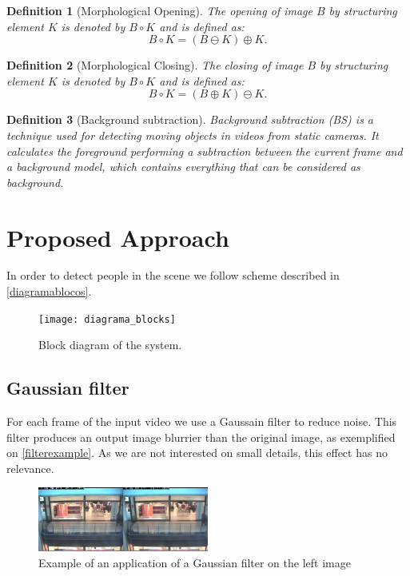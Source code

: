 \documentclass[10pt, conference]{IEEEtran}
\newtheorem{definition}{Definition}
\begin{document}
	\begin{definition}[Morphological Opening]
		The opening of image $B$ by structuring	element $K$ is denoted by $B \circ K$ and is defined as: $$B \circ K =(B \ominus K) \oplus K.$$
	\end{definition}
	
	\begin{definition}[Morphological Closing]
		The closing of image $B$ by structuring	element $K$ is denoted by $B \circ K$ and is defined as: $$B \circ K =(B \oplus K) \ominus K.$$
	\end{definition}
	
	\begin{definition}[Background subtraction]
		Background subtraction (BS) is a technique used for detecting moving objects in videos from static cameras. It calculates the foreground performing a subtraction between the current frame and a background model, which contains everything that can be considered as background.
	\end{definition}
	
	\section{Proposed Approach}
	In order to detect people in the scene we follow scheme described in \autoref{diagramablocos}.
	\begin{figure}[H]
		\centering
		\texttt{[image: diagrama\_blocks]}
		\caption{Block diagram of the system.}
		\label{diagramablocos}
	\end{figure}
	
	
	\subsection{Gaussian filter}
	For each frame of the input video we use a Gaussain filter to reduce noise. This filter produces an output image blurrier than the original image, as exemplified on \autoref{filterexample}. As we are not interested on small details, this effect has no relevance.
	\begin{figure}[H]
		\includegraphics[width=0.5\textwidth]{filterexample}
		\centering
		\caption{Example of an application of a Gaussian filter on the left image}
		\label{filterexample}
	\end{figure}
\end{document}
